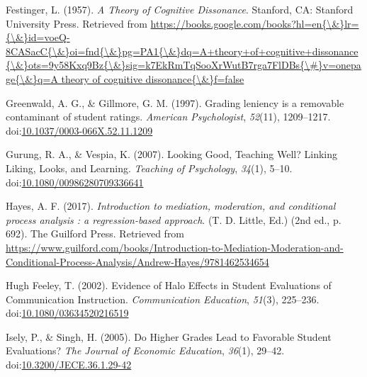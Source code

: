 \documentclass[,man]{apa6}
\theoremstyle{definition}
\theoremstyle{definition}
\theoremstyle{definition}
\theoremstyle{remark}
\begin{document}
\leavevmode\hypertarget{ref-Festinger1957}{}%
Festinger, L. (1957). \emph{A Theory of Cognitive Dissonance}. Stanford,
CA: Stanford University Press. Retrieved from
\href{https://books.google.com/books?hl=en\%7B/\&\%7Dlr=\%7B/\&\%7Did=voeQ-8CASacC\%7B/\&\%7Doi=fnd\%7B/\&\%7Dpg=PA1\%7B/\&\%7Ddq=A+theory+of+cognitive+dissonance\%7B/\&\%7Dots=9y58Kxq9Bz\%7B/\&\%7Dsig=k7EkRmTqSooXrWutB7rga7FlDBs\%7B/\#\%7Dv=onepage\%7B/\&\%7Dq=A\%20theory\%20of\%20cognitive\%20dissonance\%7B/\&\%7Df=false}{https://books.google.com/books?hl=en\{\textbackslash{}\&\}lr=\{\textbackslash{}\&\}id=voeQ-8CASacC\{\textbackslash{}\&\}oi=fnd\{\textbackslash{}\&\}pg=PA1\{\textbackslash{}\&\}dq=A+theory+of+cognitive+dissonance\{\textbackslash{}\&\}ots=9y58Kxq9Bz\{\textbackslash{}\&\}sig=k7EkRmTqSooXrWutB7rga7FlDBs\{\textbackslash{}\#\}v=onepage\{\textbackslash{}\&\}q=A theory of cognitive dissonance\{\textbackslash{}\&\}f=false}

\leavevmode\hypertarget{ref-Greenwald1997}{}%
Greenwald, A. G., \& Gillmore, G. M. (1997). Grading leniency is a
removable contaminant of student ratings. \emph{American Psychologist},
\emph{52}(11), 1209--1217.
doi:\href{https://doi.org/10.1037/0003-066X.52.11.1209}{10.1037/0003-066X.52.11.1209}

\leavevmode\hypertarget{ref-Gurung2007}{}%
Gurung, R. A., \& Vespia, K. (2007). Looking Good, Teaching Well?
Linking Liking, Looks, and Learning. \emph{Teaching of Psychology},
\emph{34}(1), 5--10.
doi:\href{https://doi.org/10.1080/00986280709336641}{10.1080/00986280709336641}

\leavevmode\hypertarget{ref-Hayes2017}{}%
Hayes, A. F. (2017). \emph{Introduction to mediation, moderation, and
conditional process analysis : a regression-based approach}. (T. D.
Little, Ed.) (2nd ed., p. 692). The Guilford Press. Retrieved from
\url{https://www.guilford.com/books/Introduction-to-Mediation-Moderation-and-Conditional-Process-Analysis/Andrew-Hayes/9781462534654}

\leavevmode\hypertarget{ref-HughFeeley2002}{}%
Hugh Feeley, T. (2002). Evidence of Halo Effects in Student Evaluations
of Communication Instruction. \emph{Communication Education},
\emph{51}(3), 225--236.
doi:\href{https://doi.org/10.1080/03634520216519}{10.1080/03634520216519}

\leavevmode\hypertarget{ref-Isely2005}{}%
Isely, P., \& Singh, H. (2005). Do Higher Grades Lead to Favorable
Student Evaluations? \emph{The Journal of Economic Education},
\emph{36}(1), 29--42.
doi:\href{https://doi.org/10.3200/JECE.36.1.29-42}{10.3200/JECE.36.1.29-42}
\end{document}

